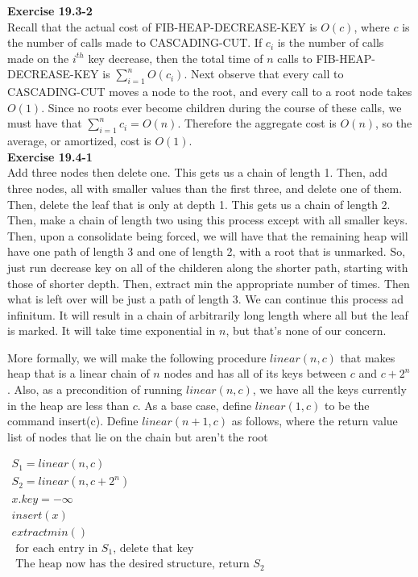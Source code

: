 \documentclass{article}
\begin{document}
\noindent\textbf{Exercise 19.3-2}\\

Recall that the actual cost of FIB-HEAP-DECREASE-KEY is $O(c)$, where $c$ is the number of calls made to CASCADING-CUT.  If $c_i$ is the number of calls made on the $i^{th}$ key decrease, then the total time of $n$ calls to FIB-HEAP-DECREASE-KEY is $\sum_{i=1}^n O(c_i)$.  Next observe that every call to CASCADING-CUT moves a node to the root, and every call to a root node takes $O(1)$.  Since no roots ever become children during the course of these calls, we must have that $\sum_{i=1}^n c_i = O(n)$.  Therefore the aggregate cost is $O(n)$, so the average, or amortized, cost is $O(1)$. \\

\noindent\textbf{Exercise 19.4-1}\\

Add three nodes then delete one. This gets us a chain of length 1. Then, add three nodes, all with smaller values than the first three, and delete one of them. Then, delete the leaf that is only at depth 1. This gets us a chain of length 2. Then, make a chain of length two using this process except with all smaller keys. Then, upon a consolidate being forced, we will have that the remaining heap will have one path of length 3 and one of length 2, with a root that is unmarked. So, just run decrease key on all of the childeren along the shorter path, starting with those of shorter depth. Then, extract min the appropriate number of times. Then what is left over will be just a path of length 3. We can continue this process ad infinitum. It will result in a chain of arbitrarily long length where all but the leaf is marked. It will take time exponential in $n$, but that's none of our concern. 

More formally, we will make the following procedure $linear(n,c)$ that makes heap that is a linear chain of $n$ nodes and has all of its keys between $c$ and $c+2^n$. Also, as a precondition of running $linear(n,c)$, we have all the keys currently in the heap are less than $c$. As a base case, define $linear(1,c)$ to be the command insert(c). Define $linear(n+1,c)$ as follows, where the return value list of nodes that lie on the chain but aren't the root

$
\begin{array}{l}
S_1 = linear(n,c)\\
S_2 = linear(n,c+2^n)\\
x.key = -\infty\\
insert(x)\\
extractmin()\\
\text{ for each entry in $S_1$, delete that key}\\
\text{ The heap now has the desired structure, return $S_2$}\\
\end{array}
$\\
\end{document}
